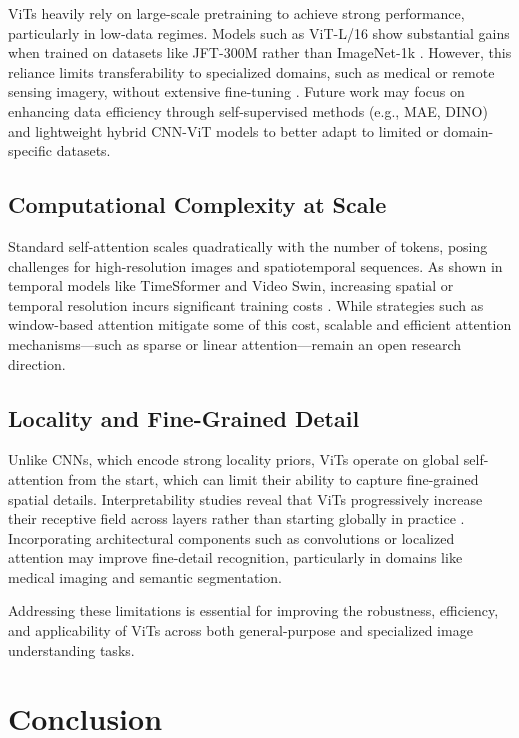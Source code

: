 \documentclass[conference]{IEEEtran}
\begin{document}
ViTs heavily rely on large-scale pretraining to achieve strong performance, particularly in low-data regimes. Models such as ViT-L/16 show substantial gains when trained on datasets like JFT-300M rather than ImageNet-1k \cite{dosovitskiy2021an}. However, this reliance limits transferability to specialized domains, such as medical or remote sensing imagery, without extensive fine-tuning \cite{ruan2022vision}. Future work may focus on enhancing data efficiency through self-supervised methods (e.g., MAE, DINO) and lightweight hybrid CNN-ViT models to better adapt to limited or domain-specific datasets.

\subsection{Computational Complexity at Scale}

Standard self-attention scales quadratically with the number of tokens, posing challenges for high-resolution images and spatiotemporal sequences. As shown in temporal models like TimeSformer and Video Swin, increasing spatial or temporal resolution incurs significant training costs \cite{liu2022videoswin}. While strategies such as window-based attention mitigate some of this cost, scalable and efficient attention mechanisms—such as sparse or linear attention—remain an open research direction.

\subsection{Locality and Fine-Grained Detail}

Unlike CNNs, which encode strong locality priors, ViTs operate on global self-attention from the start, which can limit their ability to capture fine-grained spatial details. Interpretability studies reveal that ViTs progressively increase their receptive field across layers rather than starting globally in practice \cite{raghu2021vision}. Incorporating architectural components such as convolutions or localized attention may improve fine-detail recognition, particularly in domains like medical imaging and semantic segmentation.

\smallskip
Addressing these limitations is essential for improving the robustness, efficiency, and applicability of ViTs across both general-purpose and specialized image understanding tasks.




\section{Conclusion}
\end{document}
